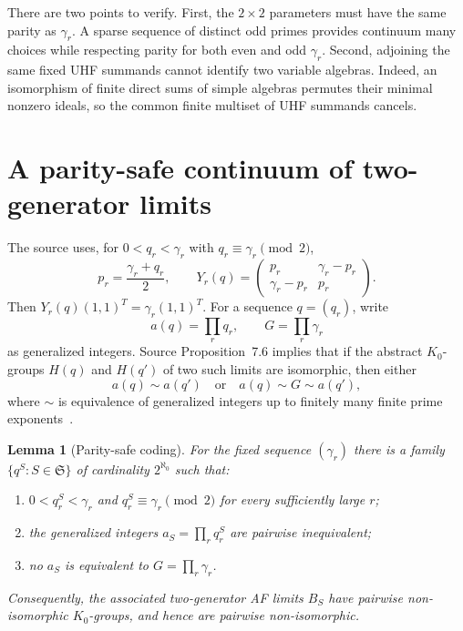 \documentclass[11pt]{article}
\newtheorem{lemma}[theorem]{Lemma}
\begin{document}
There are two points to verify. First, the $2\times2$ parameters must have the same parity as $\gamma_r$. A sparse sequence of distinct odd primes provides continuum many choices while respecting parity for both even and odd $\gamma_r$. Second, adjoining the same fixed UHF summands cannot identify two variable algebras. Indeed, an isomorphism of finite direct sums of simple algebras permutes their minimal nonzero ideals, so the common finite multiset of UHF summands cancels.

\section{A parity-safe continuum of two-generator limits}

The source uses, for $0<q_r<\gamma_r$ with $q_r\equiv\gamma_r\pmod 2$,
\begin{equation}\label{eq:block}
  p_r=\frac{\gamma_r+q_r}{2},
  \qquad
  Y_r(q)=
  \begin{pmatrix}
    p_r&\gamma_r-p_r\\
    \gamma_r-p_r&p_r
  \end{pmatrix}.
\end{equation}
Then $Y_r(q)(1,1)^T=\gamma_r(1,1)^T$. For a sequence $q=(q_r)$, write
\[
  a(q)=\prod_r q_r,
  \qquad G=\prod_r\gamma_r
\]
as generalized integers. Source Proposition~7.6 implies that if the abstract $K_0$-groups $H(q)$ and $H(q')$ of two such limits are isomorphic, then either
\begin{equation}\label{eq:source-invariant}
  a(q)\sim a(q')
  \quad\text{or}\quad
  a(q)\sim G\sim a(q'),
\end{equation}
where $\sim$ is equivalence of generalized integers up to finitely many finite prime exponents~\cite[Prop.~7.6]{source}.

\begin{lemma}[Parity-safe coding]\label{lem:coding}
For the fixed sequence $(\gamma_r)$ there is a family $\{q^S:S\in\mathfrak S\}$ of cardinality $2^{\aleph_0}$ such that:
\begin{enumerate}[label=(\roman*)]
\item $0<q_r^S<\gamma_r$ and $q_r^S\equiv\gamma_r\pmod 2$ for every sufficiently large $r$;
\item the generalized integers $a_S=\prod_rq_r^S$ are pairwise inequivalent;
\item no $a_S$ is equivalent to $G=\prod_r\gamma_r$.
\end{enumerate}
Consequently, the associated two-generator AF limits $B_S$ have pairwise non-isomorphic $K_0$-groups, and hence are pairwise non-isomorphic.
\end{lemma}
\end{document}

